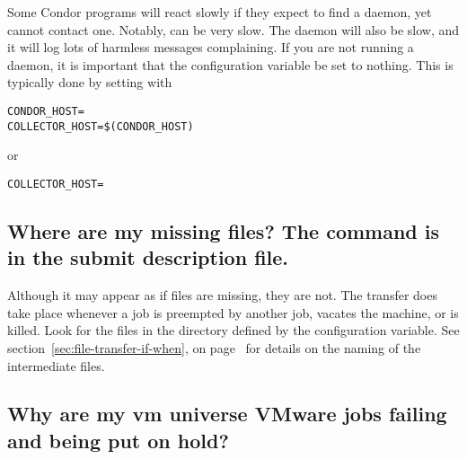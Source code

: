 Some Condor programs will react slowly if they expect to find a
 daemon, yet cannot contact one.
Notably,  can be very slow.
The  daemon will also be slow,
and it will log lots of harmless messages complaining.
If you are not running a  daemon,
it is important that the configuration variable
 be set to nothing.
This is typically done by setting  with
\footnotesize
\begin{verbatim}
CONDOR_HOST=
COLLECTOR_HOST=$(CONDOR_HOST)
\end{verbatim}
\normalsize
or
\footnotesize
\begin{verbatim}
COLLECTOR_HOST=
\end{verbatim}
\normalsize

\subsection*{Where are my missing files?  The command  is in the submit description file.}
Although it may appear as if files are missing,
they are not.
The transfer does take place whenever a job is 
preempted by another job, vacates the machine, or is killed.
Look for the files in the directory defined by
the  configuration variable.
See
section~\ref{sec:file-transfer-if-when}, on
page~\pageref{sec:file-transfer-if-when} for details on the naming
of the intermediate files.

\subsection*{\label{sec:vmware-symlink-bug}Why are my vm universe VMware jobs failing and being put on hold?}

